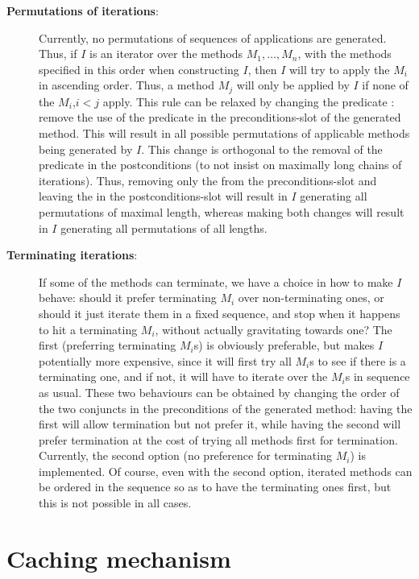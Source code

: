 \begin{description}
\item[{\bf Permutations of iterations}:]
Currently, no permutations of sequences of applications are generated.
Thus, if $I$ is an iterator over the methods $M_1,\ldots,M_n$, with
the methods specified in this order when constructing $I$, then $I$
will try to apply the $M_i$ in ascending order. Thus, a method $M_j$
will only be applied by $I$ if none of the $M_i$,$i<j$ apply. This rule
can be relaxed by changing the predicate : remove
the use of the  predicate in the preconditions-slot of the
generated method. This will result in all possible
permutations of applicable methods being generated by $I$. This change
is orthogonal to the removal of the  predicate in the
postconditions (to not insist on maximally long chains of iterations).
Thus, removing only the  from the preconditions-slot and
leaving the  in the postconditions-slot will result in
$I$ generating all permutations of maximal length, whereas making both
changes will result in $I$ generating all permutations of all lengths.

\item[{\bf Terminating iterations}:]
If some of the methods can terminate, we have a choice in
how to make $I$ behave: should it prefer
terminating $M_i$ over non-terminating ones, or should it
just iterate them in a fixed sequence, and stop when it
happens to hit a terminating $M_i$, without actually
gravitating towards one? The first (preferring terminating
$M_i$s) is obviously preferable, but makes $I$
potentially more expensive, since it will first try all
$M_i$s to see if there is a terminating one, and if not, it
will have to iterate over the $M_i$s in sequence as usual.
These two behaviours can be obtained by changing the order
of the two conjuncts in the preconditions of the generated method:
having the  first will allow termination but not prefer it,
while having the  second will prefer termination at
the cost of trying all methods first for termination.
Currently, the second option  (no preference for terminating $M_i$)
is implemented. Of course, even with the second option, iterated
methods can be ordered in the sequence so as to have the terminating
ones first, but this is not possible in all cases.
\end{description}

\section {Caching mechanism}
\label{caching}

